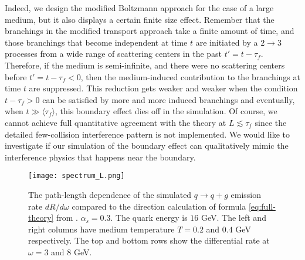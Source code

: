 Indeed, we design the modified Boltzmann approach for the case of a large medium, but it also displays a certain finite size effect. 
Remember that the branchings in the modified transport approach take a finite amount of time, and those branchings that become independent at time $t$ are initiated by a $2\rightarrow 3$ processes from a wide range of scattering centers in the past $t' = t - \tau_f$.
Therefore, if the medium is semi-infinite, and there were no scattering centers before $t' = t-\tau_f < 0$, then the medium-induced contribution to the branchings at time $t$ are suppressed.
This reduction gets weaker and weaker when the condition $t-\tau_f > 0$ can be satisfied by more and more induced branchings and eventually, when $t\gg \langle \tau_f\rangle$, this boundary effect dies off in the simulation. 
Of course, we cannot achieve full quantitative agreement with the theory at $L \lesssim \tau_f$ since the detailed few-collision interference pattern is not implemented.
We would like to investigate if our simulation of the boundary effect can qualitatively mimic the interference physics that happens near the boundary.

\begin{figure}
\singlespacing
\centering
\texttt{[image: spectrum\_L.png]}
\caption[The path-length dependence of the simulated $q\rightarrow q+g$]{The path-length dependence of the simulated $q\rightarrow q+g$ emission rate $dR/d\omega$ compared to the direction calculation of formula \ref{eq:full-theory} from \cite{CaronHuot:2010bp}. $\alpha_s = 0.3$. The quark energy is $16$ GeV. The left and right columns have medium temperature $T=0.2$ and $0.4$ GeV respectively. The top and bottom rows show the differential rate at $\omega = 3$ and $8$ GeV.}
\label{fig:spectra-L-alphas=0.3}
\end{figure}

